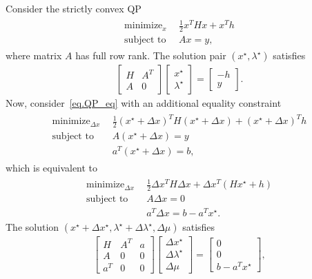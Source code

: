 \documentclass[12pt,a4paper]{article}
\newcommand{\minimize}[1]{\mathop{\mbox{minimize}}_{#1} \ \ }
\newcommand{\st}[0]{\mbox{subject to} \ \ }
\begin{document}
Consider the strictly convex QP
%
\begin{align} \label{eq.QP_eq}
  \begin{split}
    \minimize{x} & \frac{1}{2}x^THx + x^Th \\
    \st          & Ax = y,
  \end{split}
\end{align}
%
where matrix $A$ has full row rank. The solution pair
$(x^{\star},\lambda^{\star})$ satisfies
%
\begin{align} \label{eq.QP_KKT}
  \begin{bmatrix}
    H & A^T \\
    A & 0
  \end{bmatrix}
  \begin{bmatrix}
    x^{\star} \\ \lambda^{\star}
  \end{bmatrix} =
  \begin{bmatrix}
    -h \\ y
  \end{bmatrix}.
\end{align}
%
Now, consider~\eqref{eq.QP_eq} with an additional equality constraint
%
\begin{align}
  \begin{split}
    \minimize{\Delta x} & \frac{1}{2}(x^{\star} + \Delta x)^TH(x^{\star} + \Delta x) + (x^{\star} + \Delta x)^Th \\
    \st          & A(x^{\star} + \Delta x) = y \\
                 & a^T(x^{\star} + \Delta x) = b,
  \end{split}
\end{align}
%
which is equivalent to
%
%
\begin{align}
  \begin{split}
    \minimize{\Delta x} & \frac{1}{2}\Delta x^TH\Delta x + \Delta x^T(Hx^{\star} + h) \\
    \st          & A\Delta x = 0 \\
                 & a^T\Delta x = b - a^Tx^{\star}.
  \end{split}
\end{align}
%
The solution $(x^{\star} + \Delta x^{\star},\lambda^{\star} + \Delta
\lambda^{\star}, \Delta \mu)$ satisfies
%
\begin{align}
  \begin{bmatrix}
    H   & A^T & a \\
    A   &   0 & 0 \\
    a^T &   0 & 0
  \end{bmatrix}
  \begin{bmatrix}
    \Delta x^{\star} \\ \Delta \lambda^{\star} \\ \Delta \mu
  \end{bmatrix} =
  \begin{bmatrix}
    0 \\ 0 \\ b - a^Tx^{\star}
  \end{bmatrix},
\end{align}
\end{document}
